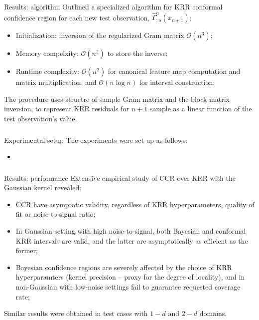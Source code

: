 \documentclass[t]{beamer}  %
\newcommand{\Ocal}{\mathcal{O}}
\begin{document}
\begin{frame}[c]\frametitle{\insertsection}
  \begin{block}{Results: algorithm}
    Outlined a specialized algorithm for KRR conformal confidence region for each
    new test observation, $\hat{\Gamma}^\alpha_{:n}(x_{n+1})$:
    \begin{itemize}
      \item Initialization: inversion of the regularized Gram matrix $\Ocal(n^3)$;
      \item Memory compelxity: $\mathcal{O}(n^2)$ to store the inverse;
      \item Runtime complexity: $\Ocal(n^2)$ for canonical feature map computation
      and matrix multiplication, and $\Ocal(n \log n)$ for interval construction;
    \end{itemize}

    The procedure uses structre of sample Gram matrix and the block matrix inversion,
    to represent KRR residuals for $n+1$ sample as a linear function of the test
    observation's value.
  \end{block}
\end{frame}

\begin{frame}[c]\frametitle{\insertsection}
  \begin{block}{Experimental setup}
    The experiments were set up as follows: \begin{itemize}
      \item 
    \end{itemize}
  \end{block}
\end{frame}

\begin{frame}[c]\frametitle{\insertsection}
  \begin{block}{Results: performance}
    Extensive empirical study of CCR over KRR with the Gaussian kernel revealed:
    \begin{itemize}
      \item CCR have asymptotic validity, regardless of KRR hyperparameters, quality
      of fit or noise-to-signal ratio;
      \item In Gaussian setting with high noise-to-signal, both Bayesian and conformal
      KRR intervals are valid, and the latter are asymptotically as efficient as the
      former;
      \item Bayesian confidence regions are severely affected by the choice of KRR
      hyperparamters (kernel precision -- proxy for the degree of locality), and
      in non-Gaussian with low-noise settings fail to guarantee requested coverage
      rate;
    \end{itemize}
    Similar results were obtained in test cases with $1-d$ and $2-d$ domains.
  \end{block}
\end{frame}
\end{document}
